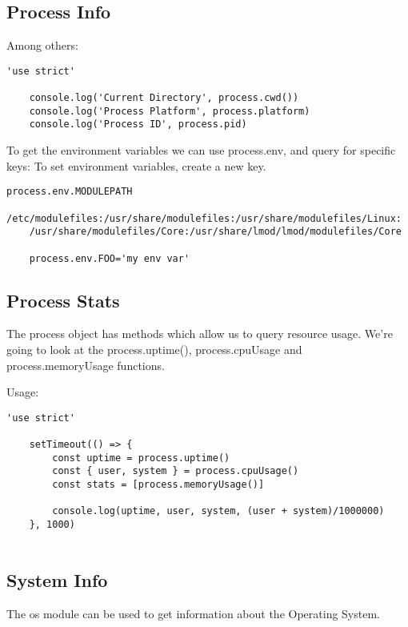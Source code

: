 \documentclass{scrartcl}
\begin{document}
\subsection{Process Info}

Among others:

\begin{lstlisting}[style=ES6]
    'use strict'

    console.log('Current Directory', process.cwd())
    console.log('Process Platform', process.platform)
    console.log('Process ID', process.pid)
\end{lstlisting}

To get the environment variables we can use process.env, and query for specific keys:
To set environment variables, create a new key.

\begin{lstlisting}[style=ES6]
    process.env.MODULEPATH
    /etc/modulefiles:/usr/share/modulefiles:/usr/share/modulefiles/Linux:
    /usr/share/modulefiles/Core:/usr/share/lmod/lmod/modulefiles/Core

    process.env.FOO='my env var'
\end{lstlisting}

\subsection{Process Stats}

The process object has methods which allow us to query resource usage. We're going to look at the process.uptime(), process.cpuUsage and process.memoryUsage functions.

Usage:

\begin{lstlisting}[style=ES6]
    'use strict'

    setTimeout(() => {
        const uptime = process.uptime()
        const { user, system } = process.cpuUsage()
        const stats = [process.memoryUsage()]

        console.log(uptime, user, system, (user + system)/1000000)
    }, 1000)


\end{lstlisting}

\subsection{System Info}

The os module can be used to get information about the Operating System.
\end{document}
